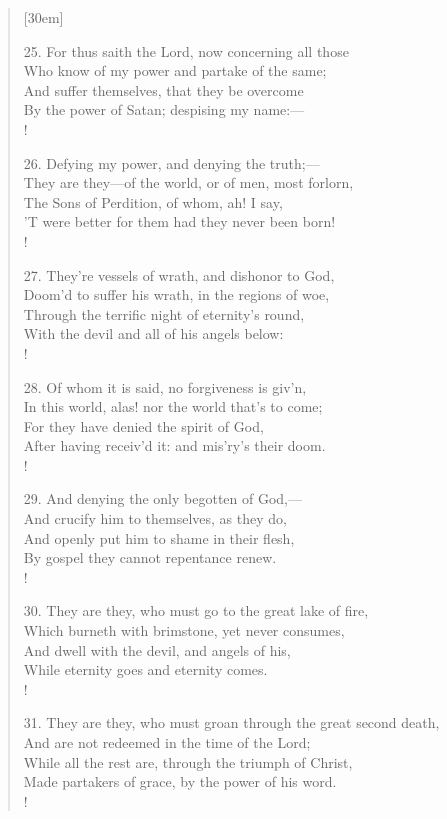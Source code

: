 \begin{verse}[30em]
\begin{altverse}
				25. For thus saith the Lord, now concerning all those \\ 
				Who know of my power and partake of the same; \\ 
				And suffer themselves, that they be overcome \\ 
				By the power of Satan; despising my name:--- \\!
				 
				26. Defying my power, and denying the truth;--- \\ 
				They are they---of the world, or of men, most forlorn, \\ 
				The Sons of Perdition, of whom, ah! I say, \\ 
				'T were better for them had they never been born! \\!
				 
				27. They're vessels of wrath, and dishonor to God, \\ 
				Doom'd to suffer his wrath, in the regions of woe, \\ 
				Through the terrific night of eternity's round, \\ 
				With the devil and all of his angels below: \\!
				 
				28. Of whom it is said, no forgiveness is giv'n, \\ 
				In this world, alas! nor the world that's to come; \\ 
				For they have denied the spirit of God, \\ 
				After having receiv'd it: and mis'ry's their doom. \\!
				 
				29. And denying the only begotten of God,--- \\ 
				And crucify him to themselves, as they do, \\ 
				And openly put him to shame in their flesh, \\ 
				By gospel they cannot repentance renew. \\!
				 
				30. They are they, who must go to the great lake of fire, \\ 
				Which burneth with brimstone, yet never consumes, \\ 
				And dwell with the devil, and angels of his, \\ 
				While eternity goes and eternity comes. \\!
				 
				31. They are they, who must groan through the great second death, \\ 
				And are not redeemed in the time of the Lord; \\ 
				While all the rest are, through the triumph of Christ, \\ 
				Made partakers of grace, by the power of his word. \\!
				 

\end{altverse}
\end{verse}
